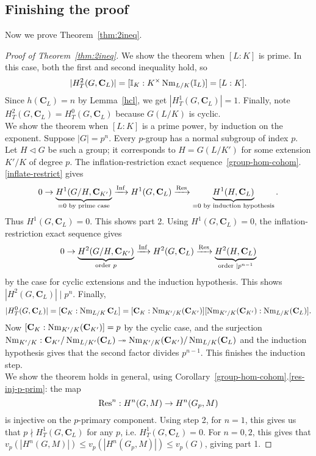 \subsection{Finishing the proof}
Now we prove Theorem~\ref{thm:2ineq}.
\begin{proof}[Proof of Theorem~\ref{thm:2ineq}]
 We show the theorem when $[L:K]$ is prime. In this case, both the first and second inequality hold, so 
\[
|H_T^2(G,\mathbf C_L)|=[\mathbb{I}_K:K^{\times}\operatorname{Nm}_{L/K}(\mathbb{I}_L)]=[L:K].
\]
Since $h(\mathbf C_L)=n$ by Lemma~\ref{hcl}, we get $|H_T^1(G,\mathbf C_L)|=1$. Finally, note $H_T^2(G,\mathbf C_L)=H_T^0(G,\mathbf C_L)$ because $G(L/K)$ is cyclic.\\

 We show the theorem when $[L:K]$ is a prime power, by induction on the exponent. Suppose $|G|=p^n$. Every $p$-group has a normal subgroup of index $p$. Let $H\triangleleft G$ be such a group; it corresponds to $H=G(L/K')$ for some extension $K'/K$ of degree $p$. The inflation-restriction exact sequence~\ref{group-hom-cohom}.\ref{inflate-restrict} gives
\[
0\to \underbrace{H^1(G/H,\mathbf C_{K'})}_{=0\text{ by prime case}} \xrightarrow{\operatorname{Inf}} H^1(G,\mathbf C_L) \xrightarrow{\operatorname{Res}} \underbrace{H^1(H,\mathbf C_L)}_{=0\text{ by induction hypothesis}}.
\]
Thus $H^1(G,\mathbf C_L)=0$. This shows part 2. Using $H^1(G,\mathbf C_L)=0$, the inflation-restriction exact sequence gives
\[
0\to \underbrace{H^2(G/H,\mathbf C_{K'})}_{\text{order }p} \xrightarrow{\operatorname{Inf}} H^2(G,\mathbf C_L) \xrightarrow{\operatorname{Res}} \underbrace{H^2(H,\mathbf C_L)}_{\text{order }\mid p^{n-1}}
\]
by the case for cyclic extensions and the induction hypothesis. This shows $|H^2(G,\mathbf C_L)|\mid  p^n$. Finally,
\[
|H_T^0(G,\mathbf C_L)|=[\mathbf C_K:\operatorname{Nm}_{L/K}\mathbf C_L]
=[\mathbf C_K:\operatorname{Nm}_{K'/K}(\mathbf C_{K'})][\operatorname{Nm}_{K'/K}(\mathbf C_{K'}):\operatorname{Nm}_{L/K}(\mathbf C_L)].
\]
Now $[\mathbf C_K:\operatorname{Nm}_{K'/K}(\mathbf C_{K'})]=p$ by the cyclic case, and the surjection $\operatorname{Nm}_{K'/K}:\mathbf C_{K'}/\operatorname{Nm}_{L/K'}(\mathbf C_L)\twoheadrightarrow \operatorname{Nm}_{K'/K}(\mathbf C_{K'})/\operatorname{Nm}_{L/K}(\mathbf C_L)$ and the induction hypothesis gives that the second factor divides $p^{n-1}$. This finishes the induction step.\\

 We show the theorem holds in general, using Corollary~\ref{group-hom-cohom}.\ref{res-inj-p-prim}: the map
\[
\operatorname{Res}^n:H^n(G,M)\to H^n(G_p,M)
\]
is injective on the $p$-primary component. Using step 2, for $n=1$, this gives us that $p\nmid H_T^1(G,\mathbf C_L)$ for any $p$, i.e. $H_T^1(G,\mathbf C_L)=0$. For $n=0,2$, this gives that $v_p(|H^n(G,M)|)\le v_p(|H^n(G_p,M)|)\le v_p(G)$, giving part 1.
\end{proof}
